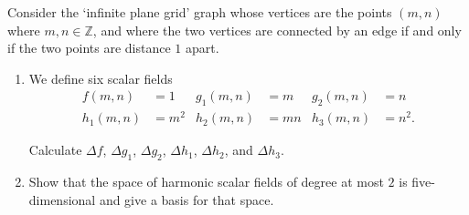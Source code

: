 \documentclass[12 pt, letterpaper]{hmcpset}
\begin{document}
\pagebreak

\begin{problem}[38.]
	Consider the `infinite plane grid' graph whose vertices are the points $(m, n)$ where $m, n \in \mathbb{Z}$, and where the two vertices are connected by an edge if and only if the two points are distance $1$ apart.
	\begin{enumerate}
		\item We define six scalar fields
			\begin{align*}
				f(m, n) & = 1 & g_{1}(m, n) & = m & g_{2}(m, n) & = n \\
				h_{1}(m, n) & = m^{2} & h_{2}(m, n) & = mn & h_{3}(m, n) & = n^{2}.
			\end{align*}

			Calculate $\Delta f$, $\Delta g_{1}$, $\Delta g_{2}$, $\Delta h_{1}$, $\Delta h_{2}$, and $\Delta h_{3}$.

		\item Show that the space of harmonic scalar fields of degree at most $2$ is five-dimensional and give a basis for that space.
	\end{enumerate}
\end{problem}
\end{document}
